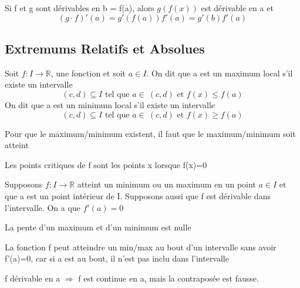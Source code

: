 \documentclass{article}
\begin{document}
\begin{theorem}
    Si f et g sont dérivables en b = f(a), alors $g(f(x))$ est dérivable
    en a et $$ (g \cdot f)'(a) = g'(f(a)) f'(a) = g'(b) f'(a) $$
\end{theorem}

\subsection{Extremums Relatifs et Absolues}

\begin{definition}
    Soit $f:I \to \mathbb{R}$, une fonction et soit $a \in I$. On dit
    que a est un maximum local s'il existe un intervalle
    $$(c,d) \subseteq I \text{ tel que } a \in \ (c,d) \text{ et }
    f(x) \leq f(a)$$
    On dit que a est un minimum local s'il existe un intervalle
    $$(c,d) \subseteq I \text{ tel que } a \in \ (c,d) \text{ et }
    f(x) \geq f(a)$$
\end{definition}

\begin{remark}
    Pour que le maximum/minimum existent, il faut que le maximum/minimum
    soit atteint
\end{remark}

\begin{definition}
    Les points critiques de f sont les points x lorsque f(x)=0
\end{definition}

\begin{theorem}
    Supposons $f:I \to \mathbb{R}$ atteint un minimum ou un maximum
    en un point $a \in I$ et que a est un point intérieur de I. Supposons
    aussi que f est dérivable dans l'intervalle. On a que $f'(a)=0$
\end{theorem}

\begin{remark}
    La pente d'un maximum et d'un minimum est nulle
\end{remark}

\begin{remark}
    La fonction f peut atteindre un min/max au bout d'un intervalle sans
    avoir f'(a)=0, car si a est au bout, il n'est pas inclu dans
    l'intervalle
\end{remark}

\begin{theorem}
    f dérivable en a $\Longrightarrow$ f est continue en a, mais la
    contraposée est fausse.
\end{theorem}
\end{document}
